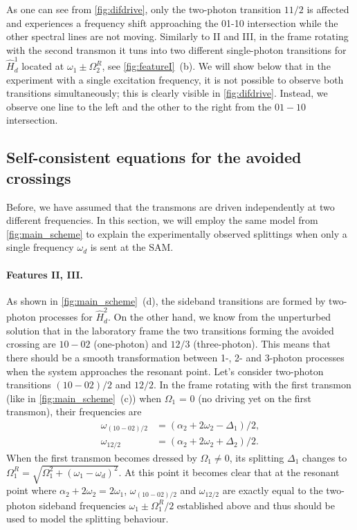 \documentclass[%
 prx,
 amsmath,amssymb,
 reprint,%
]{revtex4-1}
\begin{document}
As one can see from \autoref{fig:difdrive}, only the two-photon transition $11/2$ is affected and experiences a frequency shift approaching the 01-10 intersection while the other spectral lines are not moving. Similarly to II and III, in the frame rotating with the second transmon it tuns into two different single-photon transitions for $\hat H_d^1$ located at $\omega_1 \pm \Omega_2^R$, see \autoref{fig:featureI}~(b). We will show below that in the experiment with a single excitation frequency, it is not possible to observe both transitions simultaneously; this is clearly visible in \autoref{fig:difdrive}. Instead, we observe one line to the left and the other to the right from the $01-10$ intersection.




\subsection{Self-consistent equations for the avoided crossings}
\label{sec:münchhausen}

Before, we have assumed that the transmons are driven independently at two different frequencies. In this section, we will employ the same model from \autoref{fig:main_scheme} to explain the experimentally observed splittings when only a single frequency $\omega_d$ is sent at the SAM. 

\paragraph{Features II, III.}As shown in \autoref{fig:main_scheme}~(d), the sideband transitions are formed by two-photon processes for $\hat H_d^2$. On the other hand, we know from the unperturbed solution that in the laboratory frame the two transitions forming the avoided crossing are $10 - 02$ (one-photon) and $12/3$ (three-photon). This means that there should be a smooth transformation between 1-, 2- and 3-photon processes when the system approaches the resonant point. Let's consider two-photon transitions $(10 - 02)/2$ and $12/2$. In the frame rotating with the first transmon (like in \autoref{fig:main_scheme}~(c)) when $\Omega_1$ = 0 (no driving yet on the first transmon), their frequencies are
\begin{equation}
\begin{aligned}
\omega_{(10-02)/2} &= (\alpha_2 + 2 \omega_{2} - \Delta_1)/2,\\
 \omega_{12/2} &= (\alpha_2 + 2 \omega_{2} + \Delta_2)/2.
\end{aligned}
\end{equation}
When the first transmon becomes dressed by $\Omega_1 \neq 0$, its splitting $\Delta_1$ changes to $\Omega^R_1 =\sqrt{\Omega_{1}^2 + \left(\omega_{1} - \omega_{d}\right)^{2}}$. At this point it becomes clear that at the resonant point where $\alpha_2 + 2 \omega_{2} = 2\omega_1$, $\omega_{(10-02)/2}$ and $\omega_{12/2}$ are exactly equal to the two-photon sideband frequencies $\omega_1 \pm \Omega_1^R/2$ established above and thus should be used to model the splitting behaviour.
\end{document}
